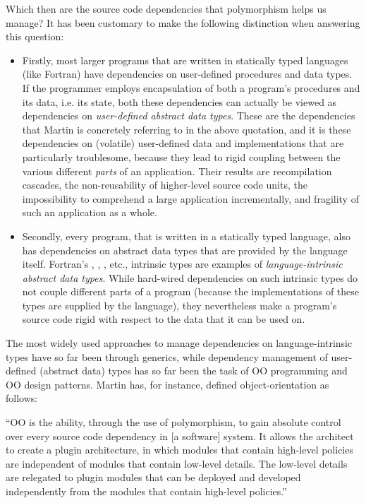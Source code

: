 \documentclass[11pt,oneside]{report}
\newcommand{\code}[1]{{\selectfont\ttfamily{#1}}}
\begin{document}
Which then are the source code dependencies that polymorphism helps us
manage? It has been customary to make the following distinction when
answering this question:
\begin{itemize}
\item
  Firstly, most larger programs that are written in statically typed
  languages (like Fortran) have dependencies on user-defined
  procedures and data types. If the programmer employs encapsulation
  of both a program's procedures and its data, i.e. its state, both
  these dependencies can actually be viewed as dependencies on
  \emph{user-defined abstract data types}. These are the dependencies
  that Martin is concretely referring to in the above quotation, and
  it is these dependencies on (volatile) user-defined data and
  implementations that are particularly troublesome, because they lead
  to rigid coupling between the various different \emph{parts} of an
  application. Their results are recompilation cascades, the
  non-reusability of higher-level source code units, the impossibility
  to comprehend a large application incrementally, and fragility of
  such an application as a whole.
\item
  Secondly, every program, that is written in a statically typed
  language, also has dependencies on abstract data types that are
  provided by the language itself. Fortran's \code{integer},
  \code{real}, \code{complex}, etc., intrinsic types are examples of
  \emph{language-intrinsic abstract data types}. While hard-wired
  dependencies on such intrinsic types do not couple different parts
  of a program (because the implementations of these types are
  supplied by the language), they nevertheless make a program's source
  code rigid with respect to the data that it can be used on.
\end{itemize}

The most widely used approaches to manage dependencies on
language-intrinsic types have so far been through generics, while
dependency management of user-defined (abstract data) types has so far
been the task of OO programming and OO design patterns. Martin
\cite{Martin_17} has, for instance, defined object-orientation as
follows:

\begin{displayquote}
  ``OO is the ability, through the use of polymorphism, to gain
  absolute control over every source code dependency in [a software]
  system. It allows the architect to create a plugin architecture, in
  which modules that contain high-level policies are independent of
  modules that contain low-level details. The low-level details are
  relegated to plugin modules that can be deployed and developed
  independently from the modules that contain high-level policies.''
\end{displayquote}
\end{document}
